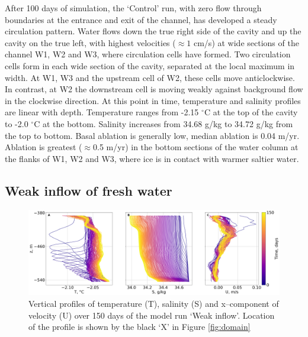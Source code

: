 After 100 days of simulation, the `Control' run, with zero flow through boundaries at the entrance and exit of the channel, has developed a steady circulation pattern.
Water flows down the true right side of the cavity and up the cavity on the true left, with highest velocities ($\approx 1$ cm/s) at wide sections of the channel W1, W2 and W3, where circulation cells have formed. Two circulation cells form in each wide section of the cavity, separated at the local maximum in width. At W1, W3 and the upstream cell of W2, these cells move anticlockwise. In contrast, at W2 the downstream cell is moving weakly against background flow in the clockwise direction.   At this point in time, temperature and salinity profiles are linear with depth. Temperature ranges from -2.15 $^{\circ}$C at the top of the cavity to -2.0 $^{\circ}$C at the bottom. Salinity increases from 34.68 g/kg to 34.72 g/kg from the top to bottom. 
Basal ablation is generally low, median ablation is 0.04 m/yr. Ablation is greatest ($\approx$0.5 m/yr) in the bottom sections of the water column at the flanks of W1, W2 and W3, where ice is in contact with warmer saltier water.

\subsection{Weak inflow of fresh water} \label{sec:weak_BC_results}

\begin{figure}[!ht]
\centering
\includegraphics[width=1\textwidth]{chapters/4/weak_inflow_TSU.png}
\caption[Weak inflow (T,S,U)]{Vertical profiles of temperature (T), salinity (S) and x--component of velocity (U) over 150 days of the model run `Weak inflow'. Location of the profile is shown by the black `X' in Figure \ref{fig:domain}}
\label{fig:weak_inflow_TSU}
\end{figure}

